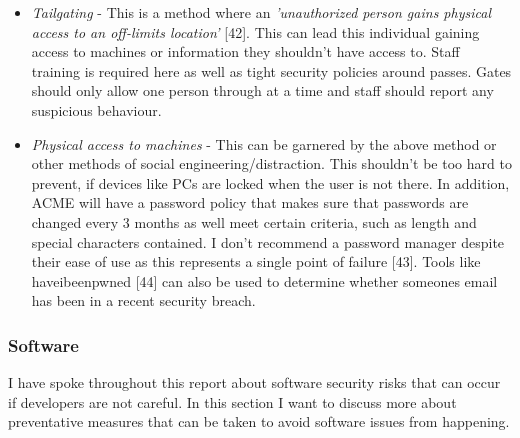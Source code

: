   \begin{itemize}
    \item \textit{Tailgating} - This is a method where an \textit{'unauthorized person gains physical access to an off-limits location'} [42]. This can 
    lead this individual gaining access to machines or information they shouldn't have access to. Staff training is required here as well as tight security
    policies around passes. Gates should only allow one person through at a time and staff should report any suspicious behaviour.

    \item \textit{Physical access to machines} - This can be garnered by the above method or other methods of social engineering/distraction. This shouldn't
    be too hard to prevent, if devices like PCs are locked when the user is not there. In addition, ACME will have a password policy that makes sure that 
    passwords are changed every 3 months as well meet certain criteria, such as length and special characters contained. I don't recommend a password manager 
    despite their ease of use as this represents a single point of failure [43]. Tools like haveibeenpwned [44] can also be used to determine whether someones 
    email has been in a recent security breach.
  
  \end{itemize}

  \subsubsection{Software}
  I have spoke throughout this report about software security risks that can occur if developers are not careful. In this section I want to discuss
  more about preventative measures that can be taken to avoid software issues from happening.

